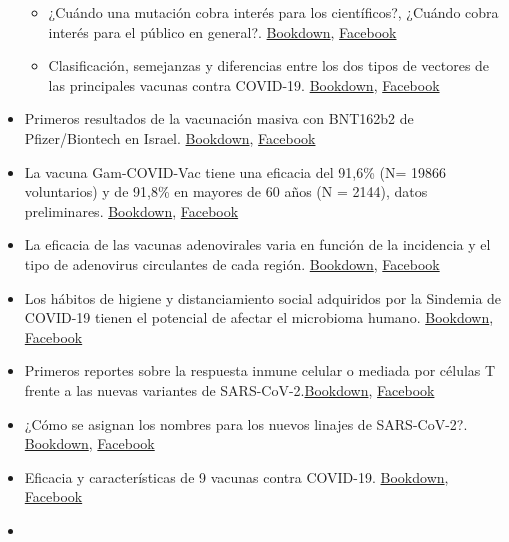 \documentclass[
  12pt, krantz2,
  spanish,
]{krantz}
\begin{document}
\begin{itemize}
  \begin{itemize}
  \item
    ¿Cuándo una mutación cobra interés para los científicos?, ¿Cuándo cobra interés para el público en general?. \href{}{Bookdown}, \href{https://www.facebook.com/permalink.php?story_fbid=238575207867301\&id=107088044349352}{Facebook}
  \item
    Clasificación, semejanzas y diferencias entre los dos tipos de vectores de las principales vacunas contra COVID-19. \href{}{Bookdown}, \href{https://www.facebook.com/permalink.php?story_fbid=241254277599394\&id=107088044349352}{Facebook}
  \end{itemize}
\item
  Primeros resultados de la vacunación masiva con BNT162b2 de Pfizer/Biontech en Israel. \href{}{Bookdown}, \href{https://www.facebook.com/permalink.php?story_fbid=244379250620230\&id=107088044349352}{Facebook}
\item
  La vacuna Gam-COVID-Vac tiene una eficacia del 91,6\% (N= 19866 voluntarios) y de 91,8\% en mayores de 60 años (N = 2144), datos preliminares. \href{}{Bookdown}, \href{https://www.facebook.com/permalink.php?story_fbid=249885460069609\&id=107088044349352}{Facebook}
\item
  La eficacia de las vacunas adenovirales varia en función de la incidencia y el tipo de adenovirus circulantes de cada región. \href{}{Bookdown}, \href{https://www.facebook.com/permalink.php?story_fbid=250473223344166\&id=107088044349352}{Facebook}
\item
  Los hábitos de higiene y distanciamiento social adquiridos por la Sindemia de COVID-19 tienen el potencial de afectar el microbioma humano. \href{}{Bookdown}, \href{https://www.facebook.com/permalink.php?story_fbid=257922015932620\&id=107088044349352}{Facebook}
\item
  Primeros reportes sobre la respuesta inmune celular o mediada por células T frente a las nuevas variantes de SARS-CoV-2.\href{}{Bookdown}, \href{https://www.facebook.com/permalink.php?story_fbid=258465985878223\&id=107088044349352}{Facebook}
\item
  ¿Cómo se asignan los nombres para los nuevos linajes de SARS-CoV-2?. \href{}{Bookdown}, \href{https://www.facebook.com/BioViral/videos/841733049886877/}{Facebook}
\item
  Eficacia y características de 9 vacunas contra COVID-19. \href{}{Bookdown}, \href{https://www.facebook.com/permalink.php?story_fbid=267375121653976\&id=107088044349352}{Facebook}
\item

\end{itemize}
\end{document}
